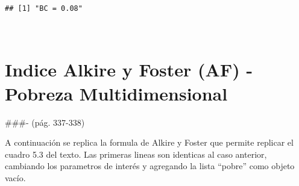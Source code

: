 \documentclass[
]{book}
\newenvironment{Shaded}{\begin{snugshade}}{\end{snugshade}}
\newcommand{\AttributeTok}[1]{\textcolor[rgb]{0.77,0.63,0.00}{#1}}
\newcommand{\DecValTok}[1]{\textcolor[rgb]{0.00,0.00,0.81}{#1}}
\newcommand{\FunctionTok}[1]{\textcolor[rgb]{0.00,0.00,0.00}{#1}}
\newcommand{\NormalTok}[1]{#1}
\newcommand{\OtherTok}[1]{\textcolor[rgb]{0.56,0.35,0.01}{#1}}
\newcommand{\SpecialCharTok}[1]{\textcolor[rgb]{0.00,0.00,0.00}{#1}}
\newcommand{\StringTok}[1]{\textcolor[rgb]{0.31,0.60,0.02}{#1}}
\begin{document}
\begin{Shaded}
\end{Shaded}

\begin{verbatim}
## [1] "BC = 0.08"
\end{verbatim}

~

\hypertarget{indice-alkire-y-foster-af---pobreza-multidimensional}{%
\section{Indice Alkire y Foster (AF) - Pobreza Multidimensional}\label{indice-alkire-y-foster-af---pobreza-multidimensional}}

\#\#\#- (pág. 337-338)

A continuación se replica la formula de Alkire y Foster que permite replicar el cuadro 5.3 del texto. Las primeras lineas son identicas al caso anterior, cambiando los parametros de interés y agregando la lista ``pobre'' como objeto vacío.
\end{document}
